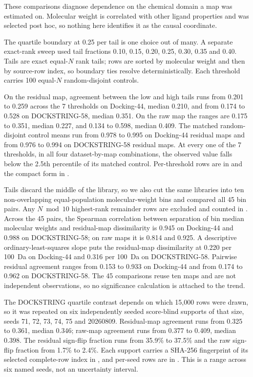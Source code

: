 These comparisons diagnose dependence on the chemical domain a map was estimated on. Molecular
weight is correlated with other ligand properties and was selected post hoc, so nothing here
identifies it as the causal coordinate.


The quartile boundary at 0.25 per tail is one choice out of many. A separate exact-rank sweep
used tail fractions 0.10, 0.15, 0.20, 0.25, 0.30, 0.35 and 0.40. Tails are exact equal-$N$ rank
tails; rows are sorted by molecular weight and then by source-row index, so boundary ties
resolve deterministically. Each threshold carries 100 equal-$N$ random-disjoint controls.

On the residual map, agreement between the low and high tails runs from 0.201 to 0.259 across
the 7 thresholds on Docking-44, median 0.210, and from 0.174 to 0.528 on DOCKSTRING-58, median
0.351. On the raw map the ranges are 0.175 to 0.351, median 0.227, and 0.134 to 0.598, median
0.409. The matched random-disjoint control means run from 0.978 to 0.995 on Docking-44 residual
maps and from 0.976 to 0.994 on DOCKSTRING-58 residual maps. At every one of the 7 thresholds,
in all four dataset-by-map combinations, the observed value falls below the 2.5th percentile of
its matched control. Per-threshold rows are in
 and the compact form
in .

Tails discard the middle of the library, so we also cut the same libraries into ten
non-overlapping equal-population molecular-weight bins and compared all 45 bin pairs. Any
$N \bmod 10$ highest-rank remainder rows are excluded and counted in
. Across the 45 pairs, the Spearman correlation between separation
of bin median molecular weights and residual-map dissimilarity is 0.945 on Docking-44 and 0.988
on DOCKSTRING-58; on raw maps it is 0.814 and 0.925. A descriptive ordinary-least-squares slope
puts the residual-map dissimilarity at 0.220 per 100~Da on Docking-44 and 0.316 per 100~Da on
DOCKSTRING-58. Pairwise residual agreement ranges from 0.153 to 0.933 on Docking-44 and from
0.174 to 0.962 on DOCKSTRING-58. The 45 comparisons reuse ten maps and are not independent
observations, so no significance calculation is attached to the trend.

The DOCKSTRING quartile contrast depends on which 15{,}000 rows were drawn, so it was repeated
on six independently seeded score-blind supports of that size, seeds 71, 72, 73, 74, 75 and
20260809. Residual-map agreement runs from 0.325 to 0.361, median 0.346; raw-map agreement runs
from 0.377 to 0.409, median 0.398. The residual sign-flip fraction runs from 35.9\% to 37.5\%
and the raw sign-flip fraction from 1.7\% to 2.4\%. Each support carries a SHA-256 fingerprint
of its selected complete-row index in , and per-seed rows are in
. This is a
range across six named seeds, not an uncertainty interval.

